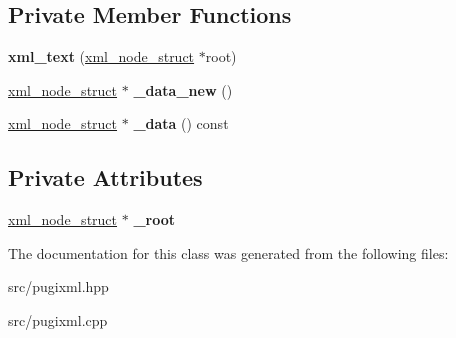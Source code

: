 \subsection*{Private Member Functions}
\begin{DoxyCompactItemize}
\item 
\mbox{\label{classpugi_1_1xml__text_ac756d9166d1282e082b27092c6351111}} 
{\bfseries xml\+\_\+text} (\hyperlink{structpugi_1_1xml__node__struct}{xml\+\_\+node\+\_\+struct} $\ast$root)
\item 
\mbox{\label{classpugi_1_1xml__text_a3681b33febe5fc3acbe59ee7afbfb018}} 
\hyperlink{structpugi_1_1xml__node__struct}{xml\+\_\+node\+\_\+struct} $\ast$ {\bfseries \+\_\+data\+\_\+new} ()
\item 
\mbox{\label{classpugi_1_1xml__text_afb6b6b66653867c496c3fcc5db0376d4}} 
\hyperlink{structpugi_1_1xml__node__struct}{xml\+\_\+node\+\_\+struct} $\ast$ {\bfseries \+\_\+data} () const
\end{DoxyCompactItemize}
\subsection*{Private Attributes}
\begin{DoxyCompactItemize}
\item 
\mbox{\label{classpugi_1_1xml__text_a4b4bfdd3a3dcf89e6711186b0c035257}} 
\hyperlink{structpugi_1_1xml__node__struct}{xml\+\_\+node\+\_\+struct} $\ast$ {\bfseries \+\_\+root}
\end{DoxyCompactItemize}


The documentation for this class was generated from the following files\+:\begin{DoxyCompactItemize}
\item 
src/pugixml.\+hpp\item 
src/pugixml.\+cpp\end{DoxyCompactItemize}
